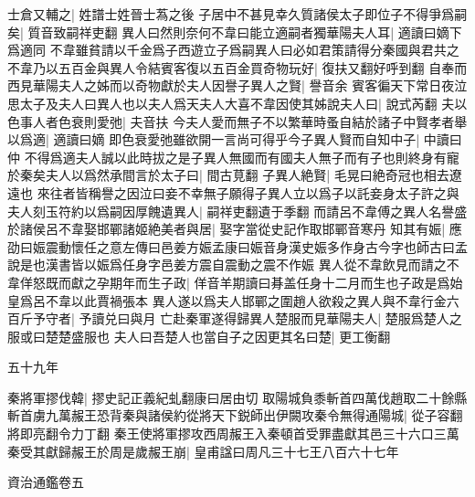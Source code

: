 士倉又輔之|{
	姓譜士姓晉士蒍之後}
子居中不甚見幸久質諸侯太子即位子不得爭爲嗣矣|{
	質音致嗣祥吏翻}
異人曰然則奈何不韋曰能立適嗣者獨華陽夫人耳|{
	適讀曰嫡下爲適同}
不韋雖貧請以千金爲子西遊立子爲嗣異人曰必如君策請得分秦國與君共之不韋乃以五百金與異人令結賓客復以五百金買奇物玩好|{
	復扶又翻好呼到翻}
自奉而西見華陽夫人之姊而以奇物獻於夫人因譽子異人之賢|{
	譽音余}
賓客徧天下常日夜泣思太子及夫人曰異人也以夫人爲天夫人大喜不韋因使其姊說夫人曰|{
	說式芮翻}
夫以色事人者色衰則愛弛|{
	夫音扶}
今夫人愛而無子不以繁華時蚤自結於諸子中賢孝者舉以爲適|{
	適讀曰嫡}
即色衰愛弛雖欲開一言尚可得乎今子異人賢而自知中子|{
	中讀曰仲}
不得爲適夫人誠以此時拔之是子異人無國而有國夫人無子而有子也則終身有寵於秦矣夫人以爲然承間言於太子曰|{
	間古莧翻}
子異人絶賢|{
	毛晃曰絶奇冠也相去遼遠也}
來往者皆稱譽之因泣曰妾不幸無子願得子異人立以爲子以託妾身太子許之與夫人刻玉符約以爲嗣因厚餽遺異人|{
	嗣祥吏翻遺于季翻}
而請呂不韋傅之異人名譽盛於諸侯呂不韋娶邯鄲諸姬絶美者與居|{
	娶字當從史記作取邯鄲音寒丹}
知其有娠|{
	應劭曰娠震動懷任之意左傳曰邑姜方娠孟康曰娠音身漢史娠多作身古今字也師古曰孟說是也漢書皆以娠爲任身字邑姜方震自震動之震不作娠}
異人從不韋飲見而請之不韋佯怒既而獻之孕期年而生子政|{
	佯音羊期讀曰朞盖任身十二月而生也子政是爲始皇爲呂不韋以此賈禍張本}
異人遂以爲夫人邯鄲之圍趙人欲殺之異人與不韋行金六百斤予守者|{
	予讀兑曰與月}
亡赴秦軍遂得歸異人楚服而見華陽夫人|{
	楚服爲楚人之服或曰楚楚盛服也}
夫人曰吾楚人也當自子之因更其名曰楚|{
	更工衡翻}


五十九年

秦將軍摎伐韓|{
	摎史記正義紀虬翻康曰居由切}
取陽城負黍斬首四萬伐趙取二十餘縣斬首虜九萬赧王恐背秦與諸侯約從將天下鋭師出伊闕攻秦令無得通陽城|{
	從子容翻將即亮翻令力丁翻}
秦王使將軍摎攻西周赧王入秦頓首受罪盡獻其邑三十六口三萬秦受其獻歸赧王於周是歲赧王崩|{
	皇甫諡曰周凡三十七王八百六十七年}


\hfill{資治通鑑卷五}
